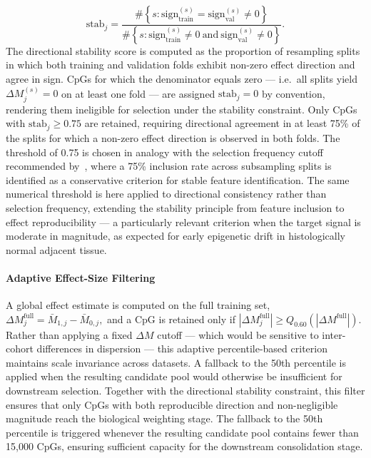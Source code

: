 \begin{equation}
\mathrm{stab}_{j}
=
\frac{
\#\!\left\{
s :
\mathrm{sign}_{\mathrm{train}}^{(s)} =
\mathrm{sign}_{\mathrm{val}}^{(s)} \neq 0
\right\}
}{
\#\!\left\{
s :
\mathrm{sign}_{\mathrm{train}}^{(s)} \neq 0
\ \text{and}\
\mathrm{sign}_{\mathrm{val}}^{(s)} \neq 0
\right\}
}.
\end{equation}
The directional stability score is computed as the proportion 
of resampling splits in which both training and validation 
folds exhibit non-zero effect direction and agree in sign. 
CpGs for which the denominator equals zero — i.e.\ all splits 
yield $\Delta M_j^{(s)} = 0$ on at least one fold — are 
assigned $\mathrm{stab}_j = 0$ by convention, rendering them 
ineligible for selection under the stability constraint.
Only CpGs with $\mathrm{stab}_{j} \geq 0.75$ are retained, requiring directional agreement in at least 75\% of the splits for which a non-zero effect direction is observed in both folds. 
The threshold of 0.75 is chosen in analogy with the selection frequency cutoff recommended by~\cite{Meinshausen2010}, where a 75\% 
inclusion rate across subsampling splits is identified as a conservative criterion for stable feature identification. The same numerical threshold is here applied to directional consistency rather than selection frequency, extending the stability principle from feature inclusion to effect reproducibility — a particularly relevant criterion when the target signal is moderate in magnitude, as expected for early epigenetic drift in histologically normal adjacent tissue.

\paragraph{Adaptive Effect-Size Filtering}

A global effect estimate is computed on the full training 
set,
\(
\Delta M_{j}^{\mathrm{full}}
=
\bar{M}_{1,j} - \bar{M}_{0,j},
\)
and a CpG is retained only if 
$|\Delta M_{j}^{\mathrm{full}}| \geq Q_{0.60}(|\Delta M^{\mathrm{full}}|)$. 
Rather than applying a fixed $\Delta M$ cutoff — which 
would be sensitive to inter-cohort differences in 
dispersion — this adaptive percentile-based criterion 
maintains scale invariance across datasets. A fallback to 
the 50th percentile is applied when the resulting 
candidate pool would otherwise be insufficient for 
downstream selection. Together with the directional 
stability constraint, this filter ensures that only CpGs 
with both reproducible direction and non-negligible 
magnitude reach the biological weighting stage.
The fallback to the 50th percentile is triggered whenever the resulting candidate pool contains fewer than 15,000 CpGs, ensuring sufficient capacity for the downstream consolidation stage.


